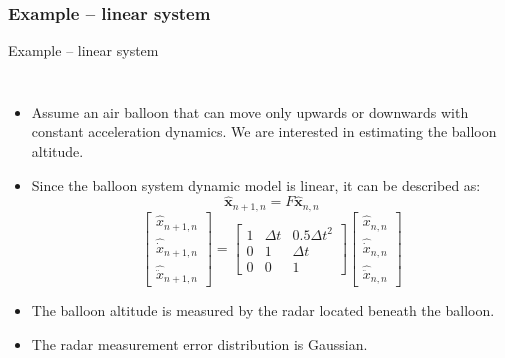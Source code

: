 \subsubsection{Example – linear system}
\begin{frame}{Example – linear system}
\begin{columns}

        \begin{itemize}
            \item Assume an air balloon that can move only upwards or downwards with constant
        acceleration dynamics. We are interested in estimating the balloon altitude.
        
        \item Since the balloon system dynamic model is linear, it can be described as:
        \vspace{-5pt}
        \[
\mathbf{\hat{x}}_{n+1,n} = F \mathbf{\hat{x}}_{n,n}
\]
\[
\begin{bmatrix} \hat{x}_{n+1,n} \\ \hat{\dot{x}}_{n+1,n} \\ \hat{\ddot{x}}_{n+1,n} \end{bmatrix} = \begin{bmatrix} 1 & \Delta t & 0.5\Delta t^2 \\ 0 & 1 & \Delta t \\ 0 & 0 & 1 \end{bmatrix} \begin{bmatrix} \hat{x}_{n,n} \\ \hat{\dot{x}}_{n,n} \\ \hat{\ddot{x}}_{n,n} \end{bmatrix}
\]

\item The balloon altitude is measured by the radar located beneath the balloon.
\item The radar measurement error distribution is Gaussian.


\end{itemize}
\end{columns}
\end{frame}
